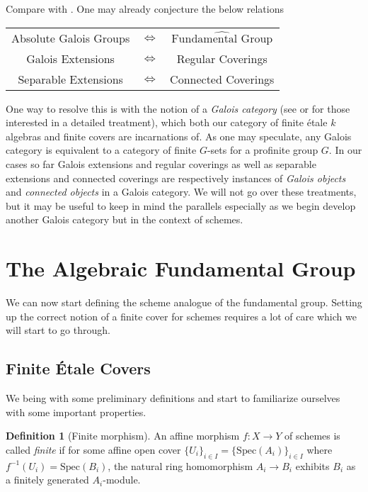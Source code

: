 \documentclass{article}
\theoremstyle{definition}
\newtheorem{definition}[theorem]{Definition}
\theoremstyle{remark}
\begin{document}
Compare with .
One may already conjecture the below relations
\begin{center}
\begin{tabular}{ |c c c| } 
\hline
	Absolute Galois Groups & $\Longleftrightarrow$ & $\widehat{\text{Fundamental Group}}$ \\
 
	Galois Extensions & $\Longleftrightarrow$ & Regular Coverings\\
 
	Separable Extensions & $\Longleftrightarrow$ & Connected Coverings\\
 \hline
\end{tabular}
\end{center}

One way to resolve this is with the notion of a \textit{Galois category} (see \cite{grothendieck} or \cite{Lenstra} for those interested in a detailed treatment), which both our category of finite \'etale $k$ algebras and finite covers are incarnations of. 
As one may speculate, any Galois category is equivalent to a category of finite $G$-sets for a profinite group $G$.
In our cases so far Galois extensions and regular coverings as well as separable extensions and connected coverings are respectively instances of \textit{Galois objects} and \textit{connected objects} in a Galois category.
We will not go over these treatments, but it may be useful to keep in mind the parallels especially as we begin develop another Galois category but in the context of schemes.



\section{The Algebraic Fundamental Group}

We can now start defining the scheme analogue of the fundamental group.
Setting up the correct notion of a finite cover for schemes requires a lot of care which we will start to go through.

\subsection{Finite \'Etale Covers}

We being with some preliminary definitions and start to familiarize ourselves with some important properties.

\begin{definition}[Finite morphism]
	An affine morphism $f: X \to Y$ of schemes is called \textit{finite} if for some affine open cover $\{U_i\}_{i \in I}  = \{\text{Spec}(A_i)\}_{i \in I}$ where $f^{-1}(U_i) = \text{Spec}(B_i)$, the natural ring homomorphism $A_i \to B_i$ exhibits $B_i$ as a finitely generated $A_i$-module.
\end{definition}
\end{document}
